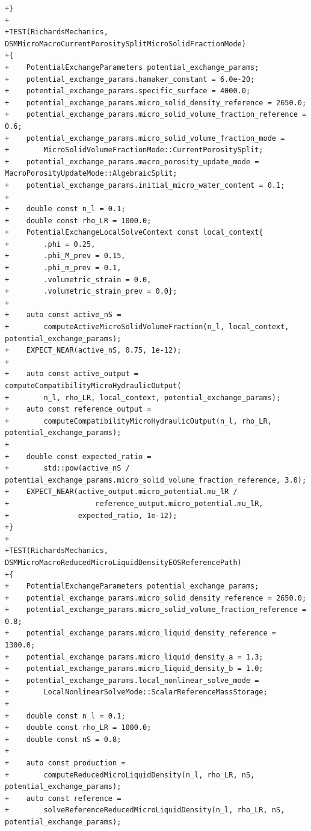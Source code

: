 \documentclass[10pt]{article}
\begin{document}
\begin{lstlisting}
+}
+
+TEST(RichardsMechanics, DSMMicroMacroCurrentPorositySplitMicroSolidFractionMode)
+{
+    PotentialExchangeParameters potential_exchange_params;
+    potential_exchange_params.hamaker_constant = 6.0e-20;
+    potential_exchange_params.specific_surface = 4000.0;
+    potential_exchange_params.micro_solid_density_reference = 2650.0;
+    potential_exchange_params.micro_solid_volume_fraction_reference = 0.6;
+    potential_exchange_params.micro_solid_volume_fraction_mode =
+        MicroSolidVolumeFractionMode::CurrentPorositySplit;
+    potential_exchange_params.macro_porosity_update_mode = MacroPorosityUpdateMode::AlgebraicSplit;
+    potential_exchange_params.initial_micro_water_content = 0.1;
+
+    double const n_l = 0.1;
+    double const rho_LR = 1000.0;
+    PotentialExchangeLocalSolveContext const local_context{
+        .phi = 0.25,
+        .phi_M_prev = 0.15,
+        .phi_m_prev = 0.1,
+        .volumetric_strain = 0.0,
+        .volumetric_strain_prev = 0.0};
+
+    auto const active_nS =
+        computeActiveMicroSolidVolumeFraction(n_l, local_context, potential_exchange_params);
+    EXPECT_NEAR(active_nS, 0.75, 1e-12);
+
+    auto const active_output = computeCompatibilityMicroHydraulicOutput(
+        n_l, rho_LR, local_context, potential_exchange_params);
+    auto const reference_output =
+        computeCompatibilityMicroHydraulicOutput(n_l, rho_LR, potential_exchange_params);
+
+    double const expected_ratio =
+        std::pow(active_nS / potential_exchange_params.micro_solid_volume_fraction_reference, 3.0);
+    EXPECT_NEAR(active_output.micro_potential.mu_lR /
+                    reference_output.micro_potential.mu_lR,
+                expected_ratio, 1e-12);
+}
+
+TEST(RichardsMechanics, DSMMicroMacroReducedMicroLiquidDensityEOSReferencePath)
+{
+    PotentialExchangeParameters potential_exchange_params;
+    potential_exchange_params.micro_solid_density_reference = 2650.0;
+    potential_exchange_params.micro_solid_volume_fraction_reference = 0.8;
+    potential_exchange_params.micro_liquid_density_reference = 1300.0;
+    potential_exchange_params.micro_liquid_density_a = 1.3;
+    potential_exchange_params.micro_liquid_density_b = 1.0;
+    potential_exchange_params.local_nonlinear_solve_mode =
+        LocalNonlinearSolveMode::ScalarReferenceMassStorage;
+
+    double const n_l = 0.1;
+    double const rho_LR = 1000.0;
+    double const nS = 0.8;
+
+    auto const production =
+        computeReducedMicroLiquidDensity(n_l, rho_LR, nS, potential_exchange_params);
+    auto const reference =
+        solveReferenceReducedMicroLiquidDensity(n_l, rho_LR, nS, potential_exchange_params);

\end{lstlisting}
\end{document}
